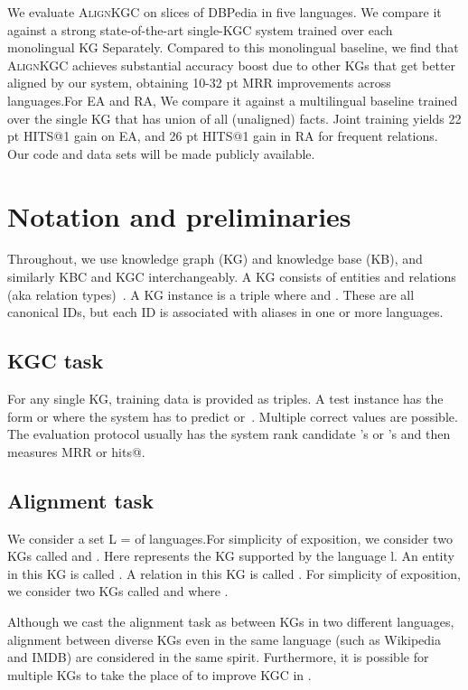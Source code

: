 \documentclass[11pt]{article}
\def\shortname{\textsc{Align\-KGC}}
\begin{document}
We evaluate \shortname{} on slices of DBPedia in five languages.  We compare it against a strong state-of-the-art single-KGC system trained over each monolingual KG Separately. Compared to this monolingual baseline, we find that \shortname{} achieves substantial accuracy boost due to other KGs that get better aligned by our system, obtaining 10-32 pt MRR improvements across languages.For EA and RA, We compare it against a multilingual baseline trained over the single KG that has union of all (unaligned) facts. Joint training yields 22 pt HITS@1 gain on EA, and 26 pt HITS@1 gain in RA for frequent relations. Our code and data sets will be made publicly available.


\section{Notation and preliminaries}
\label{sec:Prelims}

Throughout, we use knowledge graph (KG) and knowledge base (KB), and similarly KBC and KGC interchangeably.  A KG consists of entities  and relations (aka relation types)~.  A KG instance is a triple  where  and .  These are all canonical IDs, but each ID is associated with aliases in one or more languages.


\subsection{KGC task}

For any single KG, training data is provided as  triples.  A test instance has the form  or  where the system has to predict  or~.  Multiple correct values are possible.  The evaluation protocol usually has the system rank candidate 's or 's and then measures MRR or hits@.


\subsection{Alignment task}

We consider a set L =  of languages.For simplicity of exposition, we consider two KGs called  and .  Here  represents the KG supported by the language l.  An entity in this KG is called .  A relation in this KG is called . For simplicity of exposition, we consider two KGs called  and  where .


Although we cast the alignment task as between KGs in two different languages, alignment between diverse KGs even in the same language (such as Wikipedia and IMDB) are considered in the same spirit.  Furthermore, it is possible for multiple KGs to take the place of  to improve KGC in .
\end{document}
